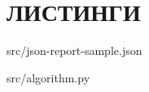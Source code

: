 \chapter{ЛИСТИНГИ}
\label{app:listings}


{src/json-report-sample.json}

\newpage


{src/algorithm.py}
